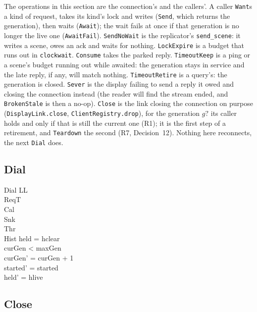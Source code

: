 \documentclass[a4paper,10pt,fleqn]{article}
\begin{document}
The operations in this section are the connection's and the callers'.  A caller
\texttt{Want}s a kind of request, takes its kind's lock and writes
(\texttt{Send}, which returns the generation), then waits (\texttt{Await}); the
wait fails at once if that generation is no longer the live one
(\texttt{AwaitFail}).  \texttt{SendNoWait} is the replicator's
\texttt{send\_scene}: it writes a scene, owes an ack and waits for nothing.
\texttt{LockExpire} is a budget that runs out in \texttt{clockwait}.
\texttt{Consume} takes the parked reply.  \texttt{TimeoutKeep} is a ping or a
scene's budget running out while awaited: the generation stays in service and
the late reply, if any, will match nothing.  \texttt{TimeoutRetire} is a
query's: the generation is closed.  \texttt{Sever} is the display failing to send a
reply it owed and closing the connection instead (the reader will find the
stream ended, and \texttt{BrokenStale} is then a no-op).  \texttt{Close} is the link closing the
connection on purpose (\texttt{DisplayLink.close},
\texttt{ClientRegistry.drop}), for the generation $g?$ its caller holds and only
if that is still the current one (R1); it is the first step of a retirement,
and \texttt{Teardown} the second (R7, Decision~12).  Nothing here reconnects,
the next \texttt{Dial} does.


\subsection{Dial}

\begin{schema}{Dial}
  \Delta LL \\
  \Xi ReqT \\
  \Xi Cal \\
  \Xi Snk \\
  \Xi Thr \\
  \Xi Hist
\where
  held = hclear \\
  curGen < maxGen \\
  curGen' = curGen + 1 \\
  started' = started \\
  held' = hlive
\end{schema}

\subsection{Close}
\end{document}
